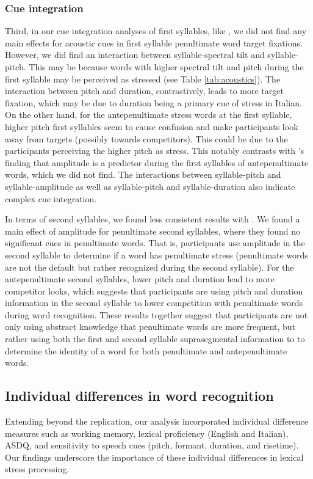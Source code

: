 \subsubsection{Cue integration}

Third, in our cue integration analyses of first syllables, like \cite{Sulpizio_McQueen_2012}, we did not find any main effects for acoustic cues in first syllable penultimate word target fixations. However, we did find an interaction between syllable-spectral tilt and syllable-pitch. This may be because words with higher spectral tilt and pitch during the first syllable may be perceived as stressed (see Table \ref{tab:acoustics}). The interaction between pitch and duration, contrastively, leads to more target fixation, which may be due to duration being a primary cue of stress in Italian. On the other hand, for the antepenultimate stress words at the first syllable, higher pitch first syllables seem to cause confusion and make participants look away from targets (possibly towards competitors). This could be due to the participants perceiving the higher pitch as stress. This notably contrasts with \cite{Sulpizio_McQueen_2012}'s finding that amplitude is a predictor during the first syllables of antepenultimate words, which we did not find. The interactions between syllable-pitch and syllable-amplitude as well as syllable-pitch and syllable-duration also indicate complex cue integration.

In terms of second syllables, we found less consistent results with \cite{Sulpizio_McQueen_2012}. We found a main effect of amplitude for penultimate second syllables, where they found no significant cues in penultimate words. That is, participants use amplitude in the second syllable to determine if a word has penultimate stress (penultimate words are not the default but rather recognized during the second syllable). For the antepenultimate second syllables, lower pitch and duration lead to more competitor looks, which suggests that participants are using pitch and duration information in the second syllable to lower competition with penultimate words during word recognition. These results together suggest that participants are not only using abstract knowledge that penultimate words are more frequent, but rather using both the first and second syllable suprasegmental information to to determine the identity of a word for both penultimate and antepenultimate words.

\subsection{Individual differences in word recognition}
Extending beyond the replication, our analysis incorporated individual difference measures such as working memory, lexical proficiency (English and Italian), ASDQ, and sensitivity to speech cues (pitch, formant, duration, and risetime). Our findings underscore the importance of these individual differences in lexical stress processing.

